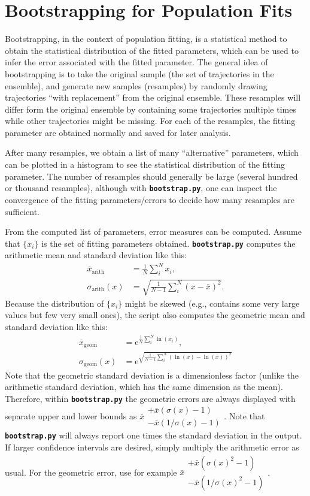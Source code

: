 \documentclass[a4paper,10pt,DIV=15,openany,twoside=false]{scrbook}
\newcommand{\ttt}[1]{\textbf{\texttt{#1}}}
\newcommand{\E}{\ensuremath{\mathrm{e}}}
\begin{document}
\section{Bootstrapping for Population Fits}\label{met:bootstrapping}

Bootstrapping, in the context of population fitting, is a statistical method to obtain the statistical distribution of the fitted parameters, which can be used to infer the error associated with the fitted parameter.
The general idea of bootstrapping is to take the original sample (the set of trajectories in the ensemble), and generate new samples (resamples) by randomly drawing trajectories ``with replacement'' from the original ensemble.
These resamples will differ form the original ensemble by containing some trajectories multiple times while other trajectories might be missing.
For each of the resamples, the fitting parameter are obtained normally and saved for later analysis.

After many resamples, we obtain a list of many ``alternative'' parameters, which can be plotted in a histogram to see the statistical distribution of the fitting parameter.
The number of resamples should generally be large (several hundred or thousand resamples), although with \ttt{bootstrap.py}, one can inspect the convergence of the fitting parameters/errors to decide how many resamples are sufficient.

From the computed list of parameters, error measures can be computed.
Assume that $\{x_i\}$ is the set of fitting parameters obtained.
\ttt{bootstrap.py} computes the arithmetic mean and standard deviation like this:
\begin{align}
  \bar{x}_\text{arith}&=\frac{1}{N}\sum_i^Nx_i,\\
  \sigma_\text{arith}(x)&=\sqrt{\frac{1}{N-1}\sum_i^N(x-\bar{x})^2}.
\end{align}
Because the distribution of $\{x_i\}$ might be skewed (e.g., contains some very large values but few very small ones), the script also computes the geometric mean and standard deviation like this:
\begin{align}
  \bar{x}_\text{geom}&=\E^{\frac{1}{N}\sum_i^N\ln(x_i)},\\
  \sigma_\text{geom}(x)&=\E^{\sqrt{\frac{1}{N-1}\sum_i^N(\ln(x)-\ln(\bar{x}))^2}}
\end{align}
Note that the geometric standard deviation is a dimensionless factor (unlike the arithmetic standard deviation, which has the same dimension as the mean).
Therefore, within \ttt{bootstrap.py} the geometric errors are always displayed with separate upper and lower bounds as $\bar{x}\substack{+\bar{x}(\sigma(x)-1) \\ -\bar{x}(1/\sigma(x)-1)}$. 
Note that \ttt{bootstrap.py} will always report one times the standard deviation in the output.
If larger confidence intervals are desired, simply multiply the arithmetic error as usual.
For the geometric error, use for example $\bar{x}\substack{+\bar{x}(\sigma(x)^2-1) \\ -\bar{x}(1/\sigma(x)^2-1)}$.
\end{document}
